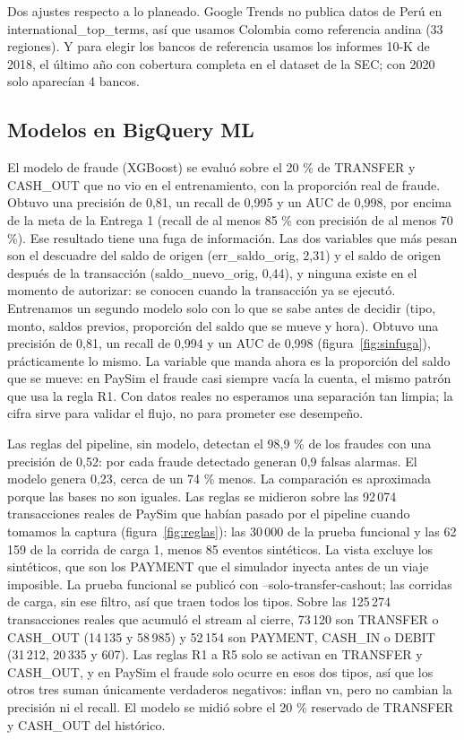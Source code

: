\documentclass[11pt,a4paper]{article}
\DeclareRobustCommand{\cod}[1]{{\small\ttfamily\codbreaks #1}}
\DeclareRobustCommand{\codbreaks}{\let\oldus\_\renewcommand{\_}{\oldus\allowbreak}}
\begin{document}
Dos ajustes respecto a lo planeado. Google Trends no publica datos de Perú en \cod{international\_top\_terms}, así que usamos Colombia como referencia andina (33 regiones). Y para elegir los bancos de referencia usamos los informes 10-K de 2018, el último año con cobertura completa en el dataset de la SEC; con 2020 solo aparecían 4 bancos.

\subsection{Modelos en BigQuery ML}

El modelo de fraude (XGBoost) se evaluó sobre el 20 \% de TRANSFER y CASH\_OUT que no vio en el entrenamiento, con la proporción real de fraude. Obtuvo una precisión de 0,81, un recall de 0,995 y un AUC de 0,998, por encima de la meta de la Entrega 1 (recall de al menos 85 \% con precisión de al menos 70 \%). Ese resultado tiene una fuga de información. Las dos variables que más pesan son el descuadre del saldo de origen (\cod{err\_saldo\_orig}, 2,31) y el saldo de origen después de la transacción (\cod{saldo\_nuevo\_orig}, 0,44), y ninguna existe en el momento de autorizar: se conocen cuando la transacción ya se ejecutó. Entrenamos un segundo modelo solo con lo que se sabe antes de decidir (tipo, monto, saldos previos, proporción del saldo que se mueve y hora). Obtuvo una precisión de 0,81, un recall de 0,994 y un AUC de 0,998 (figura~\ref{fig:sinfuga}), prácticamente lo mismo. La variable que manda ahora es la proporción del saldo que se mueve: en PaySim el fraude casi siempre vacía la cuenta, el mismo patrón que usa la regla R1. Con datos reales no esperamos una separación tan limpia; la cifra sirve para validar el flujo, no para prometer ese desempeño.

Las reglas del pipeline, sin modelo, detectan el 98,9 \% de los fraudes con una precisión de 0,52: por cada fraude detectado generan 0,9 falsas alarmas. El modelo genera 0,23, cerca de un 74 \% menos. La comparación es aproximada porque las bases no son iguales. Las reglas se midieron sobre las 92\,074 transacciones reales de PaySim que habían pasado por el pipeline cuando tomamos la captura (figura~\ref{fig:reglas}): las 30\,000 de la prueba funcional y las 62\,159 de la corrida de carga 1, menos 85 eventos sintéticos. La vista excluye los sintéticos, que son los PAYMENT que el simulador inyecta antes de un viaje imposible. La prueba funcional se publicó con \cod{--solo-transfer-cashout}; las corridas de carga, sin ese filtro, así que traen todos los tipos. Sobre las 125\,274 transacciones reales que acumuló el stream al cierre, 73\,120 son TRANSFER o CASH\_OUT (14\,135 y 58\,985) y 52\,154 son PAYMENT, CASH\_IN o DEBIT (31\,212, 20\,335 y 607). Las reglas R1 a R5 solo se activan en TRANSFER y CASH\_OUT, y en PaySim el fraude solo ocurre en esos dos tipos, así que los otros tres suman únicamente verdaderos negativos: inflan \cod{vn}, pero no cambian la precisión ni el recall. El modelo se midió sobre el 20 \% reservado de TRANSFER y CASH\_OUT del histórico.
\end{document}
